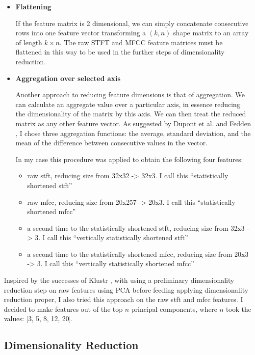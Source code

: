 \documentclass[11pt]{article}
\begin{document}
\begin{itemize}
\item \textbf{ Flattening }

If the feature matrix is 2 dimensional, we can simply concatenate consecutive rows into one feature vector transforming a \((k,n)\) shape matrix to an array of length \(k \times n\). The raw STFT and MFCC feature matrices must be flattened in this way to be used in the further steps of dimensionality reduction.

\item \textbf{ Aggregation over selected axis }

Another approach to reducing feature dimensions is that of aggregation. We can calculate an aggregate value over a particular axis, in essence reducing the dimensionality of the matrix by this axis. We can then treat the reduced matrix as any other feature vector. As suggested by Dupont et al. \cite{Dupont_2013} and Fedden \cite{medium}, I chose three aggregation functions: the average, standard deviation, and the mean of the difference between consecutive values in the vector.

In my case this procedure was applied to obtain the following four features:
\begin{itemize}
\item raw stft, reducing size from 32x32 -> 32x3. I call this ``statistically shortened stft''
\item raw mfcc, reducing size from 20x257 -> 20x3. I call this ``statistically shortened mfcc''
\item a second time to the statistically shortened stft, reducing size from 32x3 -> 3. I call this ``vertically statistically shortened stft''
\item a second time to the statistically shortened mfcc, reducing size from 20x3 -> 3. I call this ``vertically statistically shortened mfcc''
\end{itemize}
\end{itemize}

Inspired by the successes of Klustr \cite{klustr}, with using a preliminary dimensionality reduction step on raw features using PCA before feeding applying dimensionality reduction proper, I also tried this approach on the raw stft and mfcc features. I decided to make features out of the top $n$ principal components, where $n$ took the values: [3, 5, 8, 12, 20].

\subsection{Dimensionality Reduction}
\label{sec:orgfde1e30}
\end{document}
